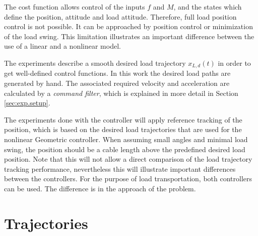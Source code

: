 The  cost function allows control of the inputs $ f $ and $ M $, and the states which define the  position,  attitude and load attitude. 
Therefore, full load position control is not possible. It can be approached by  position control or minimization of the load swing. This limitation illustrates an important difference between the use of a linear and a nonlinear model. 

The experiments describe a smooth desired load trajectory $ x_{L,d}(t) $ in order to get well-defined control functions.
In this work the desired load paths are generated by hand. The associated required velocity and acceleration are calculated by a \textit{command filter}, which is explained in more detail in Section \ref{sec:exp.setup}.

The experiments done with the  controller will apply reference tracking of the  position, which is based on the desired load trajectories that are used for the nonlinear Geometric controller. When assuming small angles and minimal load swing, the  position should be a cable length above the predefined desired load position. 
Note that this will not allow a direct comparison of the load trajectory tracking performance, nevertheless this will illustrate important differences between the controllers. 
For the purpose of load transportation, both controllers can be used. The difference is in the approach of the problem.



\newpage
\section{Trajectories}\label{sec:exp.traj}

